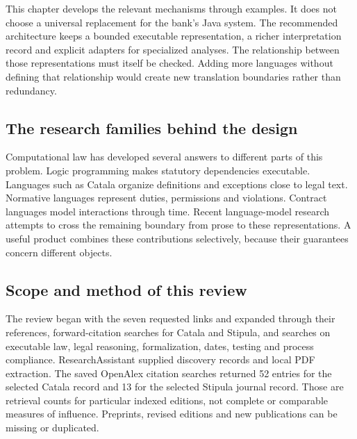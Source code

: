 \documentclass[12pt,a4paper,oneside,openany]{book}
\begin{document}
This chapter develops the relevant mechanisms through examples. It does not
choose a universal replacement for the bank's Java system. The recommended
architecture keeps a bounded executable representation, a richer interpretation
record and explicit adapters for specialized analyses. The relationship between
those representations must itself be checked. Adding more languages without
defining that relationship would create new translation boundaries rather than
redundancy.

\subsection{The research families behind the design}
\label{merge:P-02-literature:00}

\label{sec:literature}

Computational law has developed several answers to different parts of this
problem. Logic programming makes statutory dependencies executable. Languages
such as Catala organize definitions and exceptions close to legal text. Normative
languages represent duties, permissions and violations. Contract languages model
interactions through time. Recent language-model research attempts to cross the
remaining boundary from prose to these representations. A useful product combines
these contributions selectively, because their guarantees concern different
objects.

\subsection{Scope and method of this review}
\label{merge:P-02-literature:01}


The review began with the seven requested links and expanded through their
references, forward-citation searches for Catala and Stipula, and searches on
executable law, legal reasoning, formalization, dates, testing and process
compliance. ResearchAssistant supplied discovery records and local PDF extraction.
The saved OpenAlex citation searches returned 52 entries for the selected Catala
record and 13 for the selected Stipula journal record. Those are retrieval counts
for particular indexed editions, not complete or comparable measures of influence.
Preprints, revised editions and new publications can be missing or duplicated.
\end{document}
